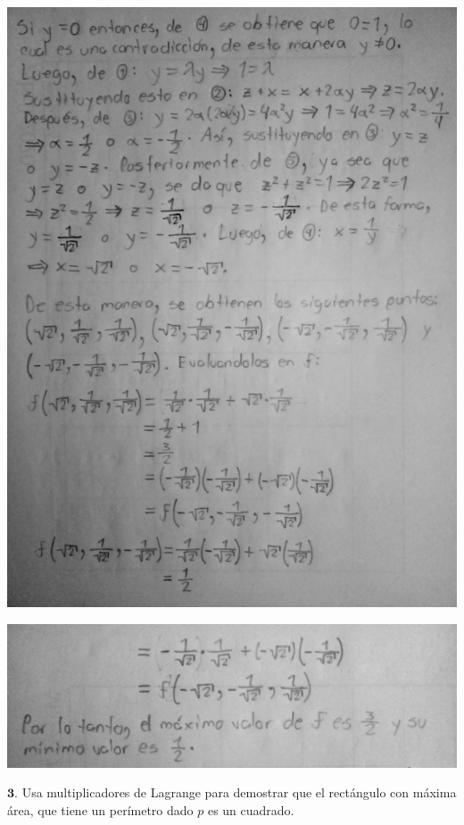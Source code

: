 \documentclass[fleqn, 12pt]{article}
\begin{document}
\begin{list}{\bfseries Ejercicio}{ \addtolength{\itemindent}{-1mm}%
    \addtolength{\labelsep}{-1mm}%
    \addtolength{\leftmargin}{-1cm}%
    \addtolength{\labelwidth}{-1cm} }
\begin{enumerate}[a)]
        \includegraphics[width = 1.0\linewidth]{Ejercicio e2.jpg}
       
        \includegraphics[width = 1.0\linewidth]{Ejercicio e3.jpg}
    \end{enumerate}

    \normalfont

    \item $ \mathbf{3.} $ Usa multiplicadores de Lagrange para demostrar que el rectángulo con máxima área, que tiene un perímetro dado $ p $ es un cuadrado.
    

\end{list}
\end{document}

